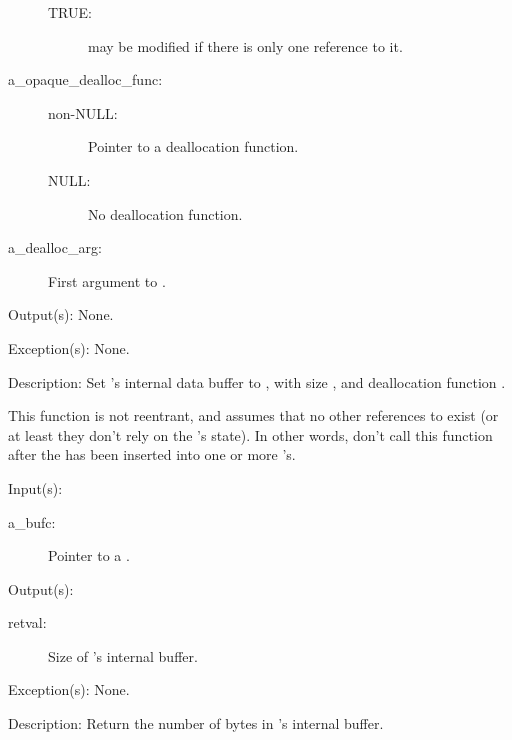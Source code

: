\begin{capi}
\begin{capilist}
\begin{description}
\begin{description}
			\item[TRUE: ]  may be modified if there
				is only one reference to it.
			\end{description}
		\item[a\_opaque\_dealloc\_func: ]
			\begin{description}\item[]
			\item[non-NULL: ] Pointer to a deallocation function.
			\item[NULL: ] No deallocation function.
			\end{description}
		\item[a\_dealloc\_arg: ]
			First argument to .
		\end{description}
	\item[Output(s): ] None.
	\item[Exception(s): ] None.
	\item[Description: ]
		Set 's internal data buffer to ,
		with size , and deallocation function
		.

		This function is not reentrant, and assumes that no other
		references to  exist (or at least they don't rely
		on the 's state).  In other words, don't call
		this function after the  has been inserted into
		one or more 's.
	\end{capilist}
\label{bufc_size_get}
	\begin{capilist}
	\item[Input(s): ]
		\begin{description}\item[]
		\item[a\_bufc: ]
			Pointer to a .
		\end{description}
	\item[Output(s): ]
		\begin{description}\item[]
		\item[retval: ]
			Size of 's internal buffer.
		\end{description}
	\item[Exception(s): ] None.
	\item[Description: ]
		Return the number of bytes in 's internal buffer.
	\end{capilist}
\end{capi}
